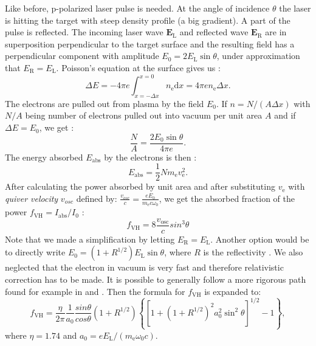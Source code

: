 Like before, p-polarized laser pulse is needed. At the angle of incidence $\theta$ the laser is hitting the target with steep density profile (a big gradient). A part of the pulse is reflected. The incoming laser wave $\bm{E}_\mathrm{L}$ and reflected wave $\bm{E}_\mathrm{R}$ are in superposition perpendicular to the target surface and the resulting field has a perpendicular component with amplitude $E_0 =  2E_\mathrm{L}\sin\theta$, under approximation that $E_\mathrm{R}=E_\mathrm{L}$. Poisson's equation at the surface gives us \cite{absorption2}:
\begin{equation}
	\label{eq:poisson}
	\Delta E = -4\pi e\int_{x=-\Delta x}^{x=0}n_\mathrm{e} \mathrm{d}x=4\pi e n_\mathrm{e} \Delta x.
\end{equation}
The electrons are pulled out from plasma by the field $E_0$. If $n=N/\left(A\Delta x\right)$ with $N/A$ being number of electrons pulled out into vacuum per unit area $A$ and if $\Delta E = E_0$, we get \cite{absorption2}:
\begin{equation}
	\frac{N}{A} = \frac{2E_0 \sin \theta}{4\pi e}.
\end{equation}
The energy absorbed $E_{\mathrm{abs}}$ by the electrons is then \cite{absorption2}:
\begin{equation}
	E_{\mathrm{abs}} = \frac{1}{2}N m_\mathrm{e} v_{\mathrm{e}}^2.
\end{equation}
After calculating the power absorbed by unit area and after substituting $v_\mathrm{e}$ with \textit{quiver velocity} $v_{osc}$ defined by: $\frac{ v_{osc}}{c} = \frac{eE_0}{m_{\mathrm{e}}c\omega_0}$, we get the absorbed fraction of the power $f_{\mathrm{VH}} = I_{\mathrm{abs}}/I_0$ \cite{absorption2}:
\begin{equation}
	f_{\mathrm{VH}} = 8 \frac{v_{\mathrm{osc}}}{c}sin^3\theta
\end{equation}
Note that we made a simplification by letting $E_\mathrm{R}=E_\mathrm{L}$. Another option would be to directly write $E_0 =  \left(1+R^{1/2}\right)E_\mathrm{L}\sin\theta$, where $R$ is the reflectivity \cite{absorption1}. We also neglected that the electron in vacuum is very fast and therefore relativistic correction has to be made. It is possible to generally follow a more rigorous path found for example in \cite{laser-plasma5} and \cite{absorption1}. Then the formula for $f_{\mathrm{VH}}$ is expanded to:
\begin{equation}
	\label{eq:vac-heating}
	f_{\mathrm{VH}} = \frac{\eta}{2\pi}\frac{1}{a_0}\frac{sin\theta}{cos\theta}\left(1+R^{1/2}\right)\left\{\left[1+\left(1+R^{1/2}\right)^2a_0^2\sin^2\theta\right]^{1/2}-1\right\},
\end{equation}
where $\eta = 1.74$ and $a_0 = eE_\mathrm{L}/(m_\mathrm{e}\omega_0c)$.

